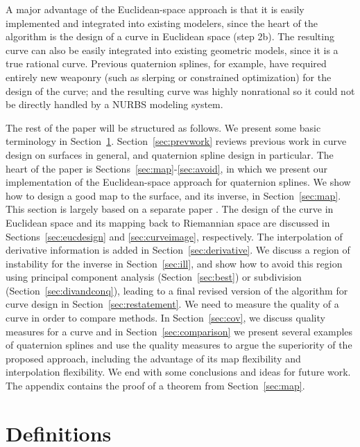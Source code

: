 A major advantage of the Euclidean-space approach is that it is easily
implemented and integrated into existing modelers,
since the heart of the algorithm is the design
of a curve in Euclidean space (step 2b).
The resulting curve can also be easily integrated into existing
geometric models, since it is a true rational curve.
Previous quaternion splines, for example, have required entirely new
weaponry (such as slerping or constrained optimization)
for the design of the curve;
and the resulting curve was highly nonrational so it could not be
directly handled by a NURBS modeling system.

The rest of the paper will be structured as follows.
We present some basic terminology in Section~\ref{sec:defn}.
Section~\ref{sec:prevwork} reviews previous work in curve design on surfaces
in general, and quaternion spline design in particular.
The heart of the paper is Sections~\ref{sec:map}-\ref{sec:avoid},
in which we present our implementation of the Euclidean-space approach
for quaternion splines.
We show how to design a good map to the surface, and its inverse,
in Section~\ref{sec:map}.
This section is largely based on a separate paper \cite{jj98a}.
The design of the curve in Euclidean space and its mapping back 
to Riemannian space are discussed in Sections~\ref{sec:eucdesign} and
\ref{sec:curveimage}, respectively.
The interpolation of derivative information is added in
Section~\ref{sec:derivative}.
We discuss a region of instability for the inverse in Section~\ref{sec:ill},
and show how to avoid this region using principal component analysis 
(Section~\ref{sec:best}) or subdivision (Section~\ref{sec:divandconq}),
leading to a final revised version of the 
algorithm for curve design in Section~\ref{sec:restatement}.
We need to measure the quality of a curve in order to compare methods.
In Section~\ref{sec:cov}, we discuss quality measures for a curve
and in Section~\ref{sec:comparison} we present several examples
of quaternion splines and use the quality measures
to argue the superiority of the proposed approach, including
the advantage of its map flexibility and interpolation flexibility.
We end with some conclusions and ideas for future work.
The appendix contains the proof of a theorem from Section~\ref{sec:map}.

\section{Definitions}
\label{sec:defn}

